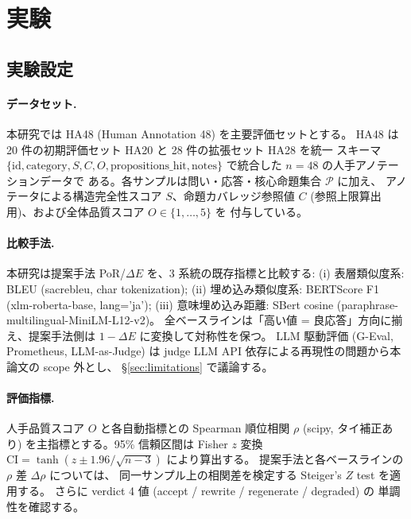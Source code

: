 %
%

\section{実験}
\label{sec:experiments}

\subsection{実験設定}
\label{sec:exp:setup}

\paragraph{データセット.}
本研究では HA48 (Human Annotation 48) を主要評価セットとする。
HA48 は 20 件の初期評価セット HA20 と 28 件の拡張セット HA28 を統一
スキーマ $\{\text{id}, \text{category}, S, C, O, \text{propositions\_hit},
\text{notes}\}$ で統合した $n = 48$ の人手アノテーションデータで
ある。各サンプルは問い・応答・核心命題集合 $\mathcal{P}$ に加え、
アノテータによる構造完全性スコア $S$、命題カバレッジ参照値 $C$
(参照上限算出用)、および全体品質スコア $O \in \{1, \ldots, 5\}$ を
付与している。

\paragraph{比較手法.}
本研究は提案手法 PoR/$\Delta E$ を、3 系統の既存指標と比較する:
(i) 表層類似度系: BLEU (sacrebleu, char tokenization);
(ii) 埋め込み類似度系: BERTScore F1 (xlm-roberta-base, lang='ja');
(iii) 意味埋め込み距離: SBert cosine (paraphrase-multilingual-MiniLM-L12-v2)。
全ベースラインは「高い値 = 良応答」方向に揃え、提案手法側は
$1 - \Delta E$ に変換して対称性を保つ。
LLM 駆動評価 (G-Eval, Prometheus, LLM-as-Judge) は
judge LLM API 依存による再現性の問題から本論文の scope 外とし、
\S\ref{sec:limitations} で議論する。

\paragraph{評価指標.}
人手品質スコア $O$ と各自動指標との Spearman 順位相関 $\rho$
(scipy, タイ補正あり) を主指標とする。95\% 信頼区間は Fisher $z$ 変換
$\mathrm{CI} = \tanh(z \pm 1.96 / \sqrt{n - 3})$ により算出する。
提案手法と各ベースラインの $\rho$ 差 $\Delta \rho$ については、
同一サンプル上の相関差を検定する Steiger's $Z$ test を適用する。
さらに verdict 4 値 (accept / rewrite / regenerate / degraded) の
単調性を確認する。

